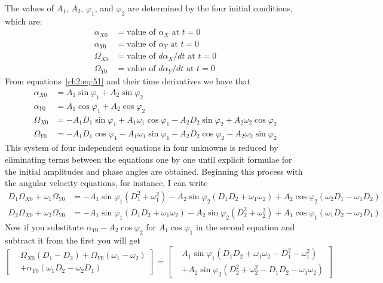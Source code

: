 The values of $A_1$, $A_2$, $\varphi_1$, and $\varphi_2$ are determined by
the four initial conditions, which are:
\begin{align*}
\alpha_{X0} &= \text{value of $\alpha_X$ at $t = 0$}\\
\alpha_{Y0} &= \text{value of $\alpha_Y$ at $t = 0$}\\
\Omega_{X0} &= \text{value of $d\alpha_X/dt$ at $t = 0$}\\
\Omega_{Y0} &= \text{value of $d\alpha_Y/dt$ at $t = 0$}
\end{align*}
From equations~\eqref{ch2:eq:51} and their time derivatives we have that
\begin{align*}
\alpha_{X0} &= A_1\sin\varphi_1 + A_2\sin\varphi_2\\
\alpha_{Y0} &= A_1\cos\varphi_1 + A_2\cos\varphi_2\\
\Omega_{X0} &= -A_1 D_1\sin\varphi_1 + A_1\omega_1\cos\varphi_1
  - A_2 D_2\sin\varphi_2 + A_2\omega_2\cos\varphi_2\\
\Omega_{Y0} &= -A_1 D_1\cos\varphi_1 - A_1\omega_1\sin\varphi_1
  - A_2 D_2\cos\varphi_2 - A_2\omega_2\sin\varphi_2
\end{align*}
This system of four independent equations in four unknowns is reduced by
eliminating terms between the equations one by one until explicit formulae for
the initial amplitudes and phase angles are obtained. Beginning this process
with the angular velocity equations, for instance, I can write
\begin{align*}
D_1\Omega_{X0} + \omega_1\Omega_{Y0}
  &= -A_1\sin\varphi_1(D_1^2 + \omega_1^2)
   - A_2\sin\varphi_2(D_1 D_2 + \omega_1\omega_2)
   + A_2\cos\varphi_2(\omega_2 D_1 - \omega_1 D_2)\\
D_2\Omega_{X0} + \omega_2\Omega_{Y0}
  &= -A_1\sin\varphi_1(D_1 D_2 + \omega_1\omega_2)
   - A_2\sin\varphi_2(D_2^2 + \omega_2^2)
   + A_1\cos\varphi_1(\omega_1 D_2 - \omega_2 D_1)
\end{align*}
Now if you substitute $\alpha_{Y0} - A_2\cos\varphi_2$ for
$A_1\cos\varphi_1$ in the second equation and subtract it from the first you
will get
\begin{equation*}
\left[\begin{aligned}
&\Omega_{X0}(D_1 - D_2) + \Omega_{Y0}(\omega_1 - \omega_2)\\
&+ \alpha_{Y0}(\omega_1 D_2 - \omega_2 D_1)
\end{aligned}\right]
=
\left[\begin{aligned}
&A_1\sin\varphi_1(D_1 D_2 + \omega_1\omega_2 - D_1^2 - \omega_1^2)\\
&+ A_2\sin\varphi_2(D_2^2 + \omega_2^2 - D_1 D_2 - \omega_1\omega_2)
\end{aligned}\right]
\end{equation*}
